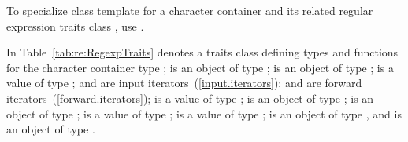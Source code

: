 \pnum
To specialize class template  for a character
container  and its related regular
expression traits class , use .

\pnum
{}%
%
%
%
In Table~\ref{tab:re:RegexpTraits}  denotes a traits class
defining types and functions for the character container
type ;  is an object of
type ;  is an object of type ;  is a value of type ; 
and  are input iterators~(\ref{input.iterators});
 and  are forward iterators~(\ref{forward.iterators});
 is a value of type ;
 is an object of type ;
 is an object of type ;
 is a value of  type ;
 is a value of type ;
 is an object of type ,
and  is an object of type .

